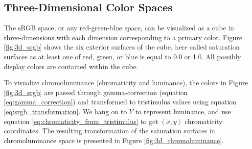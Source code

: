 \documentclass[twocolumn]{article}
\newif\ifinvert
\begin{document}
\subsection{Three-Dimensional Color Spaces}
The sRGB space, or any red-green-blue space, can be visualized as a cube in three-dimensions with each dimension corresponding to a primary color.  Figure \ref{fig:3d_srgb} shows the six exterior surfaces of the cube, here called saturation surfaces as at least one of red, green, or blue is equal to 0.0 or 1.0.  All possibly display colors are contained within the cube.\\
\begin{figure*}[h]
    \ifinvert
        
    \else
        
    \fi
    \caption{Saturated surfaces of the sRGB color space cube.  In the left panel, all colors contain at least one 0.0 for red, green, and/or blue.  In the right panel, all colors contain at least one 1.0 for red, green, and/or blue.  IMAGE LINK, CODE LINK}\label{fig:3d_srgb}
\end{figure*}

To visualize chromoluminance (chromaticity and luminance), the colors in Figure \ref{fig:3d_srgb} are passed through gamma-correction (equation \ref{eq:gamma_correction}) and transformed to tristimulus values using equation \ref{eq:srgb_transformation}.  We hang on to $Y$ to represent luminance, and use equation \ref{eq:chromaticity_from_tristimulus} to get $(x,y)$ chromaticity coordinates.  The resulting transformation of the saturation surfaces in chromoluminance space is presented in Figure \ref{fig:3d_chromoluminance}.\\
\begin{figure*}[h]
    \ifinvert
        
    \else
        
    \fi
    \caption{Saturated surfaces transformed into $(x,y,Y)$ chromoluminance space.  In the left panel, all colors contain at least one 0.0 for red, green, and/or blue (before transformation).  In the right panel, all colors contain at least one 1.0 for red, green, and/or blue (before transformation).  IMAGE LINK, CODE LINK}\label{fig:3d_chromoluminance}
\end{figure*}
\end{document}
